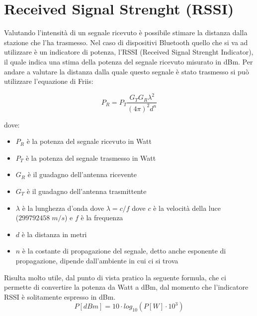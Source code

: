 \section{Received Signal Strenght (RSSI)}
Valutando l'intensità di un segnale ricevuto è possibile stimare la distanza dalla stazione che l'ha trasmesso. Nel caso di dispositivi Bluetooth quello che si va ad utilizzare è un indicatore di potenza, l'RSSI (Received Signal Strenght Indicator), il quale indica una stima della potenza del segnale ricevuto misurato in dBm. Per andare a valutare la distanza dalla quale questo segnale è stato trasmesso si può utilizzare l'equazione di Friis:

\begin{equation}
\label{eq:friis}
P_R=P_T\frac{G_T G_R \lambda^2}{(4\pi)^2 d^n}
\end{equation}

dove:
\begin{itemize}
	
	\item $P_R$ è la potenza del segnale ricevuto in Watt
	
	\item $P_T$ è la potenza del segnale trasmesso in Watt
	
	\item $G_R$ è il guadagno dell'antenna ricevente
	
	\item $G_T$ è il guadagno dell'antenna trasmittente
	
	\item $\lambda$ è la lunghezza d'onda dove $\lambda=c/f$ dove $c$ è la velocità della luce \\ ($299792458\;m/s$) e $f$ è la frequenza
	
	\item $d$ è la distanza in metri
	
	\item $n$ è la costante di propagazione del segnale, detto anche esponente di propagazione, dipende dall'ambiente in cui ci si trova
	
\end{itemize}

Risulta molto utile, dal punto di vista pratico la seguente formula, che ci permette di convertire la potenza da Watt a dBm, dal momento che l’indicatore RSSI è solitamente espresso in dBm.
\begin{equation}
\label{eq:p-dbm}
P[dBm]=10 \cdot log_{10}(P[W] \cdot 10^3)
\end{equation}

